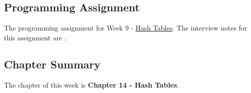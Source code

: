 \subsection{Programming Assignment}

The programming assignment for Week 9 - \href{https://github.com/QuantumCompiler/CU/tree/main/CSPB%202270%20-%20Data%20Structures/CSPB%202270%20-%20Programming%20Assignments/CSPB%202270%20-%20Assignment%207%20-%20Hash%20Table}{Hash Tables}.
The interview notes for this assignment are .

\subsection{Chapter Summary}

The chapter of this week is \textbf{Chapter 14 - Hash Tables}.

